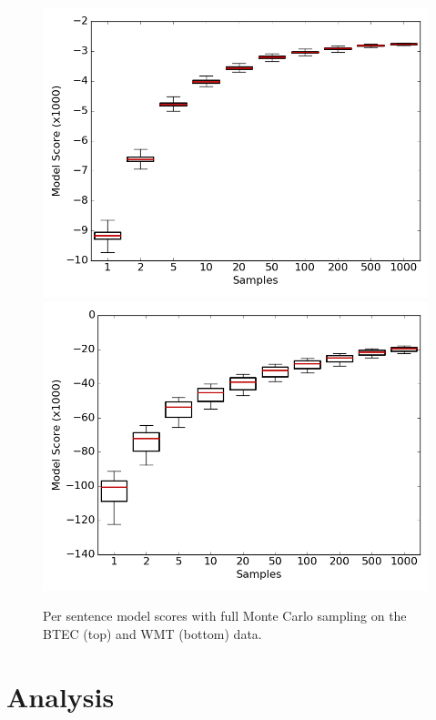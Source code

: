 \documentclass[11pt,a4paper]{article}
\begin{document}
\begin{figure}
\centering
\includegraphics[scale=0.8]{ms_btec.png}
\includegraphics[scale=0.8]{ms_wmt.png}
\caption{Per sentence model scores with full Monte Carlo sampling on the BTEC (top) and WMT (bottom) data.}
\label{fig:monte_carlo}
\end{figure}

\section{Analysis}
\label{sec:analysis}
\end{document}
